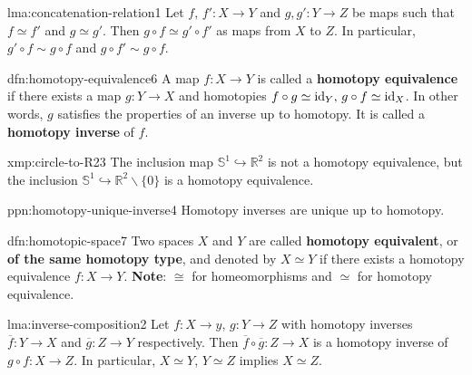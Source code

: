 \documentclass[landscape, 8pt]{extarticle}
\begin{document}
\begin{multicols*}{3}
\begin{lma}{lma:concatenation-relation}{1}
	Let $f,\, f' : X \to Y$ and $g, g' : Y \to Z$ be maps such that $f \simeq f'$ and $g \simeq g'$. Then $g \circ f \simeq g' \circ f'$ as maps from $X$ to $Z$. In particular, $g' \circ f \sim g \circ f$ and $g \circ f' \sim g \circ f$.
\end{lma}

\begin{dfn}{dfn:homotopy-equivalence}{6}
	A map $f : X \to Y$ is called a \textbf{homotopy equivalence} if there exists a map $g : Y \to X$ and homotopies $f \circ g \simeq \operatorname{id}_{Y},\, g \circ f \simeq \operatorname{id}_{X}$. In other words, $g$ satisfies the properties of an inverse up to homotopy. It is called a \textbf{homotopy inverse} of $f$.
\end{dfn}

\begin{xmp}{xmp:circle-to-R2}{3}
	The inclusion map $\mathbb{S}^{1} \hookrightarrow \mathbb{R}^{2}$ is not a homotopy equivalence, but the inclusion $\mathbb{S}^{1} \hookrightarrow \mathbb{R}^{2} \backslash \{0\}$ is a homotopy equivalence.
\end{xmp}

\begin{ppn}{ppn:homotopy-unique-inverse}{4}
	Homotopy inverses are unique up to homotopy.
\end{ppn}

\begin{dfn}{dfn:homotopic-space}{7}
	Two spaces $X$ and $Y$ are called \textbf{homotopy equivalent}, or \textbf{of the same homotopy type}, and denoted by $X \simeq Y$ if there exists a homotopy equivalence $f : X \to Y$.
	\tcbline
	\textbf{Note}: $\cong$ for homeomorphisms and $\simeq$ for homotopy equivalence.
\end{dfn}

\begin{lma}{lma:inverse-composition}{2}
	Let $f : X \to y$, $g : Y \to Z$ with homotopy inverses $\overline{f} : Y \to X$ and $\overline{g} : Z \to Y$ respectively. Then $\overline{f} \circ \overline{g} : Z \to X$ is a homotopy inverse of $g \circ f : X \to Z$. In particular, $X \simeq Y$, $Y \simeq Z$ implies $X \simeq Z$.
\end{lma}


\end{multicols*}
\end{document}
